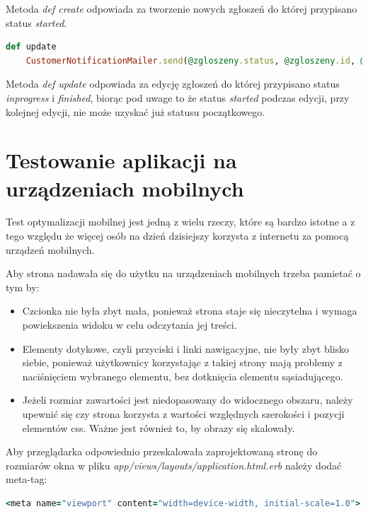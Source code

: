\documentclass[openright]{xmgr}
\begin{document}
	Metoda \textit{def create} odpowiada za tworzenie nowych zgłoszeń do której przypisano status \textit{started}.
	
	\begin{lstlisting}[language=Ruby,lineskip={-1pt},caption=Powiadomienia o rozpoczeciu i zakończeniu naprawy usterki]
	def update
	CustomerNotificationMailer.send(@zgloszeny.status, @zgloszeny.id, @zgloszeny.user_id).deliver_later if !@zgloszeny.started?
	\end{lstlisting}
	
	Metoda \textit{def update} odpowiada za edycję zgłoszeń do której przypisano status \textit{inprogress} i \textit{finished}, biorąc pod uwage to że status \textit{started} podczas edycji, przy kolejnej edycji, nie może  uzyskać już statusu początkowego.
	
	\chapter{Testowanie aplikacji na urządzeniach mobilnych}
	
	Test optymalizacji mobilnej jest jedną z wielu rzeczy, które są bardzo istotne a z tego względu że więcej osób na dzień dzisiejszy korzysta z internetu za pomocą urządzeń mobilnych. 

	Aby strona nadawała się do użytku na urządzeniach mobilnych trzeba pamietać o tym by:
	
	\begin{itemize}
		\item Czcionka nie była zbyt mała, ponieważ strona staje się nieczytelna i wymaga powiekszenia widoku w celu odczytania jej treści.
		\item Elementy dotykowe, czyli przyciski i linki nawigacyjne, nie były zbyt blisko siebie, ponieważ użytkownicy korzystając z takiej strony mają problemy z naciśnięciem wybranego elementu, bez dotknięcia elementu sąsiadującego.
		\item Jeżeli rozmiar zawartości jest niedopasowany do widocznego obszaru, należy upewnić się czy strona korzysta z wartości względnych szerokości i pozycji elementów css. Ważne jest również to, by obrazy się skalowały.
	\end{itemize}
	
	\newpage
	Aby przeglądarka odpowiednio przeskalowała zaprojektowaną stronę do rozmiarów okna w pliku \textit{app/views/layouts/application.html.erb} należy dodać meta-tag:
	
	\begin{lstlisting}[language=Ruby,lineskip={-1pt},caption=Meta tag odpowiedzialny za skalowanie]
	<meta name="viewport" content="width=device-width, initial-scale=1.0">
	\end{lstlisting}
	
\end{document}
